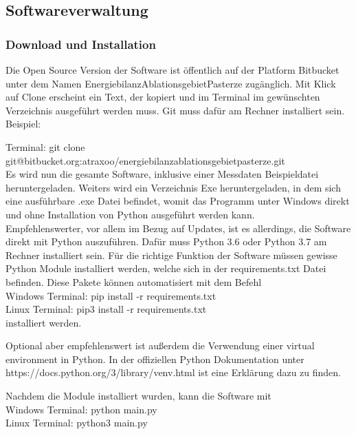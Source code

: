 \documentclass[12pt,a4paper]{article}
\begin{document}
\subsection{Softwareverwaltung}
\subsubsection{Download und Installation}
Die Open Source Version der Software ist öffentlich auf der Platform Bitbucket unter dem Namen EnergiebilanzAblationsgebietPasterze zugänglich. Mit Klick auf Clone erscheint ein Text, der kopiert und im Terminal im gewünschten Verzeichnis ausgeführt werden muss. Git muss dafür am Rechner installiert sein.\\

Beispiel:

Terminal: \textsf{\small git clone git@bitbucket.org:atraxoo/energiebilanzablationsgebietpasterze.git}\\


Es wird nun die gesamte Software, inklusive einer Messdaten Beispieldatei heruntergeladen. Weiters wird ein Verzeichnis Exe heruntergeladen, in dem sich eine ausführbare .exe Datei befindet, womit das Programm unter Windows direkt und ohne Installation von Python ausgeführt werden kann.\\

Empfehlenswerter, vor allem im Bezug auf Updates, ist es allerdings, die Software direkt mit Python auszuführen. Dafür muss Python 3.6 oder Python 3.7 am Rechner installiert sein. Für die richtige Funktion der Software müssen gewisse Python Module installiert werden, welche sich in der requirements.txt Datei befinden. Diese Pakete können automatisiert mit dem Befehl\\

Windows Terminal: \textsf{\small pip install -r requirements.txt}\\
Linux Terminal:  \textsf{\small pip3 install -r requirements.txt}\\

installiert werden.

Optional aber empfehlenswert ist außerdem die Verwendung einer virtual environment in Python. In der offiziellen Python Dokumentation unter \textsf{\small https://docs.python.org/3/library/venv.html} ist eine Erklärung dazu zu finden.

Nachdem die Module installiert wurden, kann die Software mit \\

Windows Terminal: \textsf{\small python main.py}\\
Linux Terminal: \textsf{\small python3 main.py}\\
\end{document}
